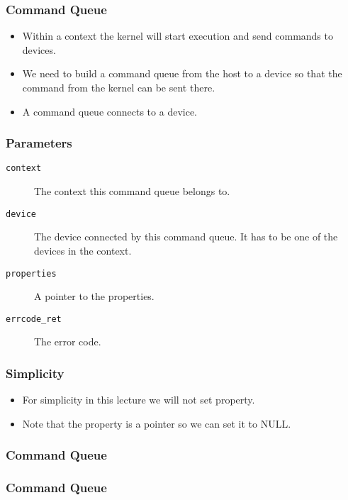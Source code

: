 \documentclass{beamer}
\begin{document}
\begin{frame}
  \frametitle{Command Queue}
  \begin{itemize}
  \item Within a context the kernel will start execution and send
    commands to devices.
  \item We need to build a command queue from the host to a device so
    that the command from the kernel can be sent there.
  \item A command queue connects to a device.
  \end{itemize}
\end{frame}

\begin{frame}
\end{frame}

\begin{frame}
  \frametitle{Parameters}
  \begin{description}
  \item [\tt context] The context this command queue belongs to.
  \item [\tt device] The device connected by this command queue. It has
    to be one of the devices in the context.
  \item [\tt properties] A pointer to the properties.
  \item [\tt errcode\_ret] The error code.
  \end{description}
\end{frame}

\begin{frame}
  \frametitle{Simplicity}
  \begin{itemize}
  \item For simplicity in this lecture we will not set property.
  \item Note that the property is a pointer so we can set it to NULL.
  \end{itemize}
\end{frame}

\begin{frame}
  \frametitle{Command Queue}
\end{frame}

\begin{frame}
  \frametitle{Command Queue}
  \centerline{}
\end{frame}
\end{document}
